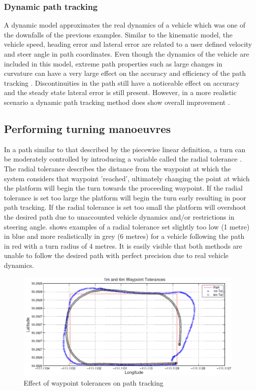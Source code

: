 \documentclass[main.tex]{subfiles}
\begin{document}
\subsubsection{Dynamic path tracking}
A dynamic model approximates the real dynamics of a vehicle which was one of the downfalls of the previous examples. Similar to the kinematic model, the vehicle speed, heading error and lateral error are related to a user defined velocity and steer angle in path coordinates. Even though the dynamics of the vehicle are included in this model, extreme path properties such as large changes in curvature can have a very large effect on the accuracy and efficiency of the path tracking \parencite{snider2009}. Discontinuities in the path still have a noticeable effect on accuracy and the steady state lateral error is still present. However, in a more realistic scenario a dynamic path tracking method does show overall improvement \parencite{snider2009}.

\subsection{Performing turning manoeuvres}
In a path similar to that described by the piecewise linear definition, a turn can be moderately controlled by introducing a variable called the radial tolerance \parencite{Giesbrecht2005}. The radial tolerance describes the distance from the waypoint at which the system considers that waypoint 'reached', ultimately changing the point at which the platform will begin the turn towards the proceeding waypoint. If the radial tolerance is set too large the platform will begin the turn early resulting in poor path tracking. If the radial tolerance is set too small the platform will overshoot the desired path due to unaccounted vehicle dynamics and/or restrictions in steering angle.  shows examples of a radial tolerance set slightly too low (1 metre) in blue and more realistically in grey (6 metres) for a vehicle following the path in red with a turn radius of 4 metres. It is easily visible that both methods are unable to follow the desired path with perfect precision due to real vehicle dynamics.
\begin{figure}[ht]
\includegraphics[width=\textwidth]{2-LiteratureReview/waypointTolerances.PNG}
\centering
\caption[Effect of waypoint tolerances on path tracking]{Effect of waypoint tolerances on path tracking \parencite{Giesbrecht2005}} 
\end{figure}
\end{document}
